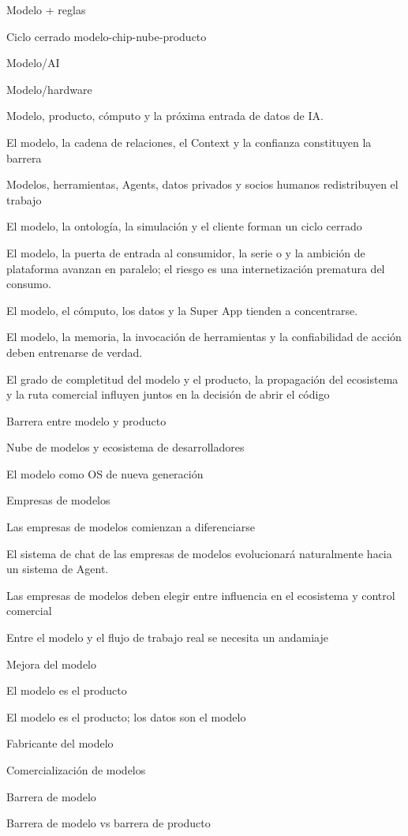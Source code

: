 \documentclass{article}
\begin{document}
Modelo + reglas

Ciclo cerrado modelo-chip-nube-producto

Modelo/AI

Modelo/hardware

Modelo, producto, cómputo y la próxima entrada de datos de IA.

El modelo, la cadena de relaciones, el Context y la confianza constituyen la barrera

Modelos, herramientas, Agents, datos privados y socios humanos redistribuyen el trabajo

El modelo, la ontología, la simulación y el cliente forman un ciclo cerrado

El modelo, la puerta de entrada al consumidor, la serie o y la ambición de plataforma avanzan en paralelo; el riesgo es una internetización prematura del consumo.

El modelo, el cómputo, los datos y la Super App tienden a concentrarse.

El modelo, la memoria, la invocación de herramientas y la confiabilidad de acción deben entrenarse de verdad.

El grado de completitud del modelo y el producto, la propagación del ecosistema y la ruta comercial influyen juntos en la decisión de abrir el código

Barrera entre modelo y producto

Nube de modelos y ecosistema de desarrolladores

El modelo como OS de nueva generación

Empresas de modelos

Las empresas de modelos comienzan a diferenciarse

El sistema de chat de las empresas de modelos evolucionará naturalmente hacia un sistema de Agent.

Las empresas de modelos deben elegir entre influencia en el ecosistema y control comercial

Entre el modelo y el flujo de trabajo real se necesita un andamiaje

Mejora del modelo

El modelo es el producto

El modelo es el producto; los datos son el modelo

Fabricante del modelo

Comercialización de modelos

Barrera de modelo

Barrera de modelo vs barrera de producto
\end{document}
